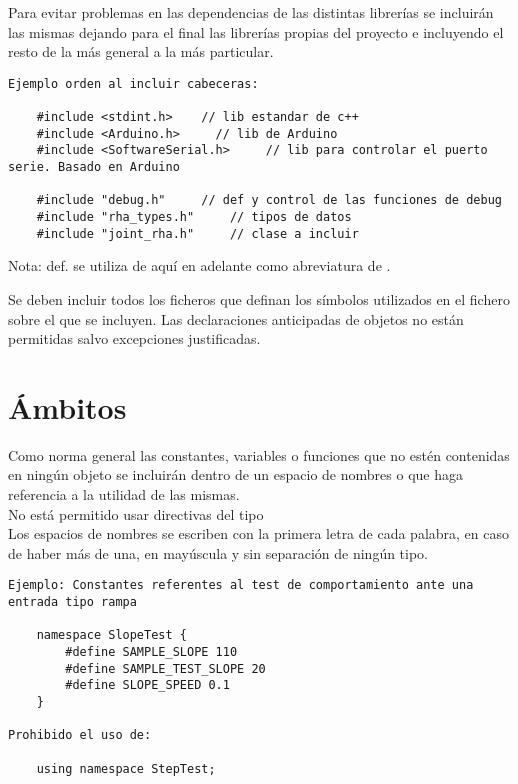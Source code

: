 
    Para evitar problemas en las dependencias de las distintas librerías se incluirán las mismas dejando para el final las librerías propias del proyecto e incluyendo el resto de la más general a la más particular. 
    \\ 
    
    \lstset{language=C, breaklines=true, basicstyle=\footnotesize}
    \begin{lstlisting}[frame=single]
Ejemplo orden al incluir cabeceras:

    #include <stdint.h>    // lib estandar de c++
    #include <Arduino.h>     // lib de Arduino
    #include <SoftwareSerial.h>     // lib para controlar el puerto serie. Basado en Arduino
    
    #include "debug.h"     // def y control de las funciones de debug
    #include "rha_types.h"     // tipos de datos
    #include "joint_rha.h"     // clase a incluir
    \end{lstlisting}
    
    Nota: def. se utiliza de aquí en adelante como abreviatura de .
    
    Se deben incluir todos los ficheros que definan los símbolos utilizados en el fichero sobre el que se incluyen. Las declaraciones anticipadas de objetos no están permitidas salvo excepciones justificadas.
 
\section{Ámbitos}\label{sec:codificacionSW:ambitos}

    Como norma general las constantes, variables o funciones que no estén contenidas en ningún objeto se incluirán dentro de un espacio de nombres o  que haga referencia a la utilidad de las mismas.
    \\ 
    
    No está permitido usar directivas del tipo 
    \\ 
    
    Los espacios de nombres se escriben con la primera letra de cada palabra, en caso de haber más de una, en mayúscula y sin separación de ningún tipo.
    \\ 
    
    \lstset{language=C, breaklines=true, basicstyle=\footnotesize}
    \begin{lstlisting}[frame=single]
Ejemplo: Constantes referentes al test de comportamiento ante una entrada tipo rampa

    namespace SlopeTest {
        #define SAMPLE_SLOPE 110
        #define SAMPLE_TEST_SLOPE 20
        #define SLOPE_SPEED 0.1
    }
    
Prohibido el uso de:
    
    using namespace StepTest;
    \end{lstlisting}
    
